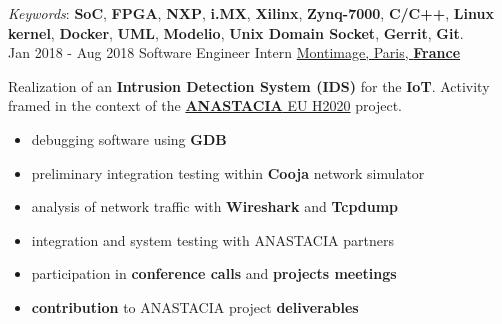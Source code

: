 \documentclass[letterpaper]{twentysecondcv} %
\begin{document}
\begin{twenty}
{            \vspace{1 mm}
            \textit{Keywords}: \textbf{SoC}, \textbf{FPGA}, \textbf{NXP}, \textbf{i.MX}, \textbf{Xilinx}, \textbf{Zynq-7000}, \textbf{C/C++}, \textbf{Linux kernel}, \textbf{Docker}, \textbf{UML}, \textbf{Modelio}, \textbf{Unix Domain Socket}, \textbf{Gerrit}, \textbf{Git}.
        }\\
    \twentyitem
    	{Jan 2018 -}
		{Aug 2018}
        {Software Engineer Intern}
        {\href{https://www.montimage.com/}{Montimage, Paris, \textbf{France}}}
        {}
        {
            Realization of an \textbf{Intrusion Detection System (IDS)} for the \textbf{IoT}. Activity framed in the context of the \href{http://www.anastacia-h2020.eu/}{\textbf{ANASTACIA} EU H2020} project.
            \vspace{1 mm}
            \begin{itemize}
                \item debugging software using \textbf{GDB}
                \item preliminary integration testing within \textbf{Cooja} network simulator
                \item analysis of network traffic with \textbf{Wireshark} and \textbf{Tcpdump}
                \item integration and system testing with ANASTACIA partners
                \item participation in \textbf{conference calls} and \textbf{projects meetings}
                \item \textbf{contribution} to ANASTACIA project \textbf{deliverables}
            \end{itemize}

}
\end{twenty}
\end{document}
